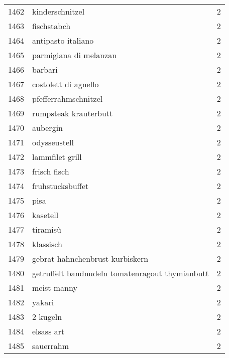 \begin{tabular}{llr}
1462 &                                    kinderschnitzel &      2 \\
1463 &                                        fischstabch &      2 \\
1464 &                                 antipasto italiano &      2 \\
1465 &                             parmigiana di melanzan &      2 \\
1466 &                                            barbari &      2 \\
1467 &                               costolett di agnello &      2 \\
1468 &                               pfefferrahmschnitzel &      2 \\
1469 &                              rumpsteak krauterbutt &      2 \\
1470 &                                           aubergin &      2 \\
1471 &                                       odysseustell &      2 \\
1472 &                                    lammfilet grill &      2 \\
1473 &                                       frisch fisch &      2 \\
1474 &                                   fruhstucksbuffet &      2 \\
1475 &                                               pisa &      2 \\
1476 &                                           kasetell &      2 \\
1477 &                                           tiramisù &      2 \\
1478 &                                          klassisch &      2 \\
1479 &                    gebrat hahnchenbrust kurbiskern &      2 \\
1480 &    getruffelt bandnudeln tomatenragout thymianbutt &      2 \\
1481 &                                        meist manny &      2 \\
1482 &                                             yakari &      2 \\
1483 &                                           2 kugeln &      2 \\
1484 &                                         elsass art &      2 \\
1485 &                                          sauerrahm &      2 \\

\end{tabular}
